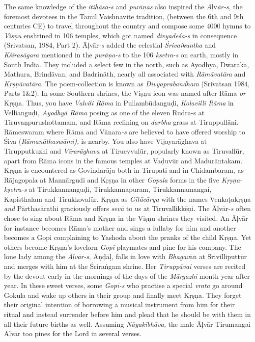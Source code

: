 \item The same knowledge of the \textit{itihāsa-s} and \textit{purāņas} also inspired the \textit{Ā}ļv\textit{ār-s}, the foremost devotees in the Tamil Vaishnavite tradition, (between the 6th and 9th centuries CE) to travel throughout the country and compose some 4000 hymns to \textit{Viṣṇu} enshrined in 106 temples, which got named \textit{divyadeśa-s} in consequence (Srivatsan, 1984, Part 2). Āļvār\textit{-s} added the celestial \textit{Śrivaikuntha} and \textit{Kśīrasāgara} mentioned in the \textit{purāṇa-s} to the 106 \textit{kṣetra-s} on earth, mostly in South India. They included a select few in the north, such as Ayodhya, Dwaraka, Mathura, Brindāvan, and Badrināth, nearly all associated with \textit{Rāmāvatāra} and \textit{Kṛṣṇāvatāra}. The poem-collection is known as \textit{Divyaprabandham} (Srivatsan 1984, Parts 1\&2). In some Southern shrines, the Viṣṇu icon was named after Rāma\textit{ or} Kṛṣṇa. Thus, you have \textit{Valvili Rāma} in Pullambūdanguḍi, \textit{Kolavilli Rāma} in Vellianguḍi\textit{, Ayodhyā Rāma} posing as one of the eleven Rudra-s at Tiruvaṇpurushottamam, and Rāma reclining on \textit{darbha} grass at Tiruppullāni. Rāmeswaram where Rāma and Vānara\textit{-s} are believed to have offered worship to Śiva (\textit{Rāmanāthaswāmi),} is nearby. You also have Vijayarāghava at Tirupputkuzhi and \textit{Vīrarāghava} at Tiruevvulūr, popularly known as Tiruvallūr, apart from Rāma icons in the famous temples at Vaḍuvūr and Madurāntakam. Kṛṣṇa is encountered as Govindarāja both in Tirupati and in Chidambaram, as Rājagopala at Mannārgudi and Kṛṣṇa in other \textit{Gopala} forms in the five \textit{Kṛṣṇa-kṣetra-s} at Tirukkannanguḍi, Tirukkannapuram, Tirukkannamangai, Kapisthalam and Tirukkovalūr. Kṛṣṇa as \textit{Gītācārya} with the names Venkaṭakṛṣṇa\textit{ and} Pārthasārathi graciously offers \textit{sevā} to us at Tiruvallikkēṇi. The Āļvār-\textit{s} often chose to sing about Rāma and Kṛṣṇa in the Viṣṇu shrines they visited\textit{.} An Āļvār for instance becomes Rāma’s mother and sings a lullaby for him and another becomes a Gopi complaining to Yashoda about the pranks of the child Kṛṣṇa. Yet others become Kṛṣṇa’s lovelorn \textit{Gopī} playmates and pine for his company. The lone lady among the \textit{Āļvār-s}, Āṇḍāḷ\textit{,} falls in love with \textit{Bhagav}ān at Srivilliputtūr and merges with him at the Śriraṅgam shrine. Her \textit{Tiruppāvai} verses are recited by the devout early in the mornings of the days of the \textit{Mārgazhi} month year after year. In these sweet verses, some \textit{Gopī-s} who practise a special \textit{vrata} go around Gokula and wake up others in their group and finally meet Kṛṣṇa\textit{.} They forget their original intention of borrowing a musical instrument from him for their ritual and instead surrender before him and plead that he should be with them in all their future births as well. Assuming \textit{Nāyakībhāva,} the male Āļvār Tirumangai Āļvār too pines for the Lord in several verses.

